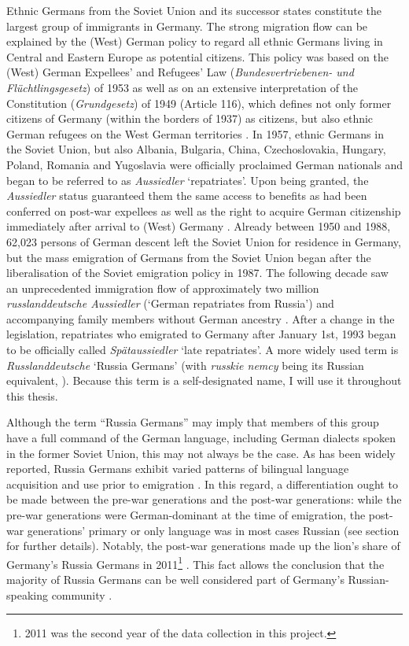 Ethnic Germans from the Soviet Union and its successor states constitute the largest group of immigrants in Germany. The strong migration flow can be explained by the (West) German policy to regard all ethnic Germans living in Central and Eastern Europe as potential citizens. This policy was based on the (West) German Expellees' and Refugees' Law (\textit{Bundesvertriebenen- und Flüchtlingsgesetz}) of 1953 as well as on an extensive interpretation of the Constitution (\textit{Grundgesetz}) of 1949 (Article 116), which defines  not only former citizens of Germany (within the borders of 1937) as citizens, but also ethnic German refugees on the West German territories \citep{muenz03}. In 1957, ethnic Germans in the Soviet Union, but also Albania, Bulgaria, China, Czechoslovakia, Hungary, Poland, Romania and Yugoslavia were officially proclaimed German nationals and began to be referred to as \textit{Aussiedler} `repatriates'. Upon being granted, the \textit{Aussiedler} status guaranteed them the same access to benefits as had been conferred on post-war expellees as well as the right to acquire German citizenship immediately after arrival to (West) Germany \citep{muenz03}. Already between 1950 and 1988, 62,023 persons of German descent left the Soviet Union for residence in Germany, but the mass emigration of Germans from the Soviet Union began after the liberalisation of the Soviet emigration policy in 1987. The following decade saw an unprecedented immigration flow of approximately two million \textit{russlanddeutsche Aussiedler} (`German repatriates from Russia') and accompanying family members without German ancestry \citep{lederer97}. After a change in the legislation, repatriates who emigrated to Germany after January 1st, 1993 began to be officially called \textit{Spätaussiedler} `late repatriates'. A more widely used term is \textit{Russlanddeutsche} `Russia Germans' (with \textit{russkie nemcy} being its Russian equivalent, \citealt[cf.][]{meng-protas}). Because this term is a self-designated name, I will use it throughout this thesis.\largerpage

Although the term “Russia Germans” may imply that members of this group have a full command of the German language, including German dialects spoken in the former Soviet Union, this may not always be the case. As has been widely reported, Russia Germans exhibit varied patterns of bilingual language acquisition and use prior to emigration \citep{berend98,meng01,riehlTA,worbs-etal-13}. In this regard, a differentiation ought to be made between the pre-war generations and the post-war generations: while the pre-war generations were German-dominant at the time of emigration, the post-war generations' primary or only language was in most cases Russian (see section  for further details). Notably, the post-war generations made up the lion's share of Germany's Russia Germans in 2011\footnote{2011 was the second year of the data collection in this project.} \citep[41]{worbs-etal-13}. This fact allows the conclusion that the majority of Russia Germans can be well considered part of Germany's Russian-speaking community \citep[cf.][]{meng01,roll03,brehmer07}.

